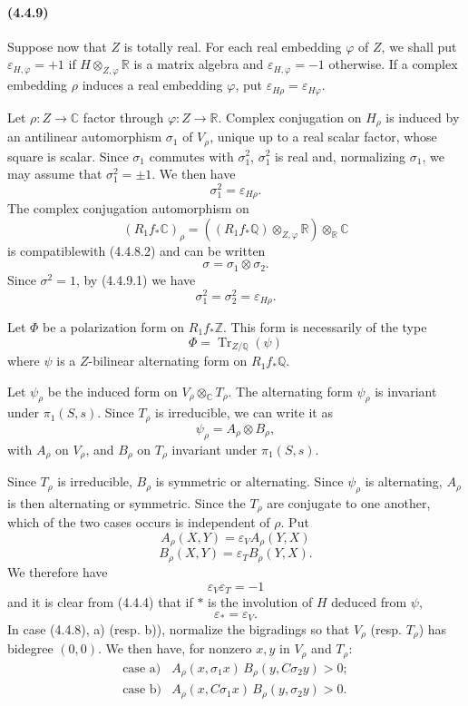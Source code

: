 \documentclass[10pt]{article}
\newcommand{\C}{\mathbb C}
\newcommand{\Q}{\mathbb Q}
\newcommand{\Z}{\mathbb Z}
\newcommand{\fg}{\guillemotright}
\newcommand{\og}{\guillemotleft}
\newcommand{\R}{\mathbb R}
\newcommand{\Tr}{\operatorname{Tr}}
\begin{document}

\paragraph{(4.4.9)} Suppose now that $Z$ is totally real. For each real embedding $\varphi$ of $Z$, we shall put $\varepsilon_{H,\varphi}=+1$ if $H\otimes_{Z,\varphi}\R$ is a matrix algebra and $\varepsilon_{H,\varphi}=-1$ otherwise. If a complex embedding $\rho$ induces a real embedding $\varphi$, put $\varepsilon_{H\rho}=\varepsilon_{H\varphi}$.

Let $\rho:Z\to\C$ factor through $\varphi:Z\to\R$. Complex conjugation on $H_\rho$ is induced by an antilinear automorphism $\sigma_1$ of $V_\rho$, unique up to a real scalar factor, whose square is scalar. Since $\sigma_1$ commutes with $\sigma_1^2$, $\sigma_1^2$ is real and, normalizing $\sigma_1$, we may assume that $\sigma_1^2=\pm1$. We then have
\[
\tag{4.4.9.1}
\sigma_1^2=\varepsilon_{H\rho}.
\]
The complex conjugation automorphism on
\[
(R_1f_*\C)_\rho=((R_1f_*\Q)\otimes_{Z,\varphi}\R)\otimes_\R\C
\]
is \og compatible\fg with (4.4.8.2) and can be written
\[
\sigma=\sigma_1\otimes\sigma_2.
\]
Since $\sigma^2=1$, by (4.4.9.1) we have
\[
\tag{4.4.9.2}
\sigma_1^2=\sigma_2^2=\varepsilon_{H\rho}.
\]

Let $\Phi$ be a polarization form on $R_1f_*\Z$. This form is necessarily of the type
\[
\Phi=\Tr_{Z/\Q}(\psi)
\]
where $\psi$ is a $Z$-bilinear alternating form on $R_1f_*\Q$.

Let $\psi_\rho$ be the induced form on $V_\rho\otimes_\C T_\rho$. The alternating form $\psi_\rho$ is invariant under $\pi_1(S,s)$. Since $T_\rho$ is irreducible, we can write it as
\[
\tag{4.4.9.3}
\psi_\rho=A_\rho\otimes B_\rho,
\]
with $A_\rho$ on $V_\rho$, and $B_\rho$ on $T_\rho$ invariant under $\pi_1(S,s)$.

Since $T_\rho$ is irreducible, $B_\rho$ is symmetric or alternating. Since $\psi_\rho$ is alternating, $A_\rho$ is then alternating or symmetric. Since the $T_\rho$ are conjugate to one another, which of the two cases occurs is independent of $\rho$. Put
\[
\tag{4.4.9.4}
A_\rho(X,Y)=\varepsilon_V A_\rho(Y,X)
\]
\[
\tag{4.4.9.5}
B_\rho(X,Y)=\varepsilon_T B_\rho(Y,X).
\]
We therefore have
\[
\tag{4.4.9.6}
\varepsilon_V\varepsilon_T=-1
\]
and it is clear from (4.4.4) that if $*$ is the involution of $H$ deduced from $\psi$,
\[
\tag{4.4.9.7}
\varepsilon_*=\varepsilon_V.
\]
In case (4.4.8), a) (resp. b)), normalize the bigradings so that $V_\rho$ (resp. $T_\rho$) has bidegree $(0,0)$. We then have, for nonzero $x,y$ in $V_\rho$ and $T_\rho$:
\[
\begin{array}{ll}
\text{case a)}& A_\rho(x,\sigma_1x)\,B_\rho(y,C\sigma_2y)>0;\\[0.3em]
\text{case b)}& A_\rho(x,C\sigma_1x)\,B_\rho(y,\sigma_2y)>0.
\end{array}
\]
\end{document}
